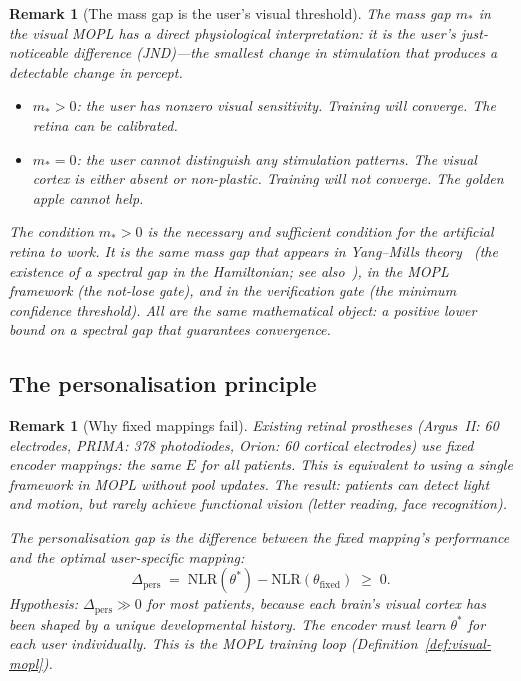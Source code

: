 \documentclass[11pt,a4paper]{article}
\newtheorem{remark}[theorem]{Remark}
\begin{document}
\begin{remark}[The mass gap is the user's visual threshold]%
\label{rem:mass-gap-vision}
The mass gap $m_*$ in the visual MOPL has a direct
physiological interpretation: it is the user's
\emph{just-noticeable difference} (JND)---the smallest
change in stimulation that produces a detectable
change in percept.
\begin{itemize}[nosep]
\item $m_* > 0$: the user has nonzero visual sensitivity.
  Training will converge.
  The retina can be calibrated.
\item $m_* = 0$: the user cannot distinguish any
  stimulation patterns.
  The visual cortex is either absent or non-plastic.
  Training will not converge.
  The golden apple cannot help.
\end{itemize}
The condition $m_* > 0$ is the \emph{necessary and
sufficient} condition for the artificial retina
to work.
It is the same mass gap that appears in
Yang--Mills theory~\cite{YM54} (the existence of a spectral gap
in the Hamiltonian; see also~\cite{Zhang2026YM}),
in the MOPL framework
(the not-lose gate), and in the verification gate
(the minimum confidence threshold).
All are the same mathematical object:
a positive lower bound on a spectral gap that
guarantees convergence.
\end{remark}

\subsection{The personalisation principle}
\label{app:personalisation}

\begin{remark}[Why fixed mappings fail]%
\label{rem:fixed-fail}
Existing retinal prostheses (Argus~II: 60 electrodes,
PRIMA: 378 photodiodes, Orion: 60 cortical electrodes)
use fixed encoder mappings: the same $E$ for all patients.
This is equivalent to using a single framework in MOPL
without pool updates.
The result: patients can detect light and motion,
but rarely achieve functional vision
(letter reading, face recognition).

The personalisation gap is the difference between
the fixed mapping's performance and the optimal
user-specific mapping:
\[
  \Delta_{\text{pers}}
    \;=\; \mathrm{NLR}(\theta^*) - \mathrm{NLR}(\theta_{\mathrm{fixed}})
    \;\geq\; 0.
\]
Hypothesis: $\Delta_{\text{pers}} \gg 0$ for most patients,
because each brain's visual cortex has been shaped by a
unique developmental history.
The encoder must learn $\theta^*$ for each user individually.
This is the MOPL training loop
(Definition~\ref{def:visual-mopl}).
\end{remark}
\end{document}
